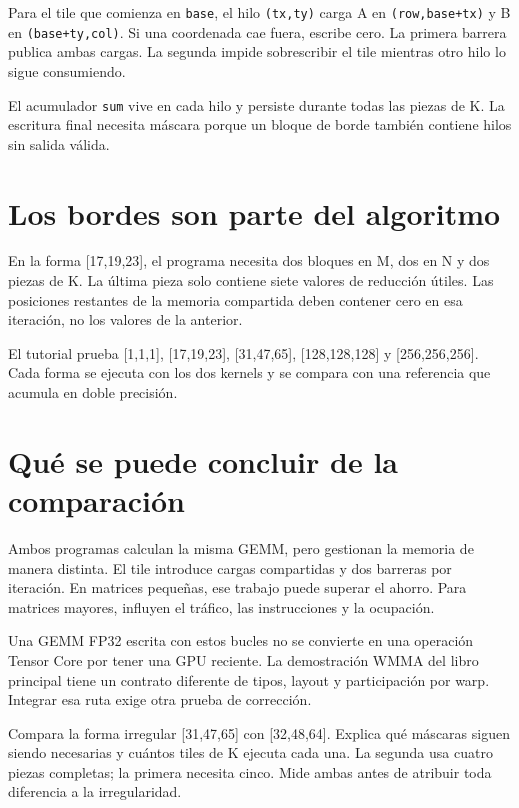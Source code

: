 \documentclass[12pt,a4paper,oneside]{report}
\begin{document}
Para el tile que comienza en \texttt{base}, el hilo \texttt{(tx,ty)} carga A en \texttt{(row,base+tx)} y B en \texttt{(base+ty,col)}. Si una coordenada cae fuera, escribe cero. La primera barrera publica ambas cargas. La segunda impide sobrescribir el tile mientras otro hilo lo sigue consumiendo.

El acumulador \texttt{sum} vive en cada hilo y persiste durante todas las piezas de K. La escritura final necesita máscara porque un bloque de borde también contiene hilos sin salida válida.

\section{Los bordes son parte del algoritmo}
En la forma [17,19,23], el programa necesita dos bloques en M, dos en N y dos piezas de K. La última pieza solo contiene siete valores de reducción útiles. Las posiciones restantes de la memoria compartida deben contener cero en esa iteración, no los valores de la anterior.

El tutorial prueba [1,1,1], [17,19,23], [31,47,65], [128,128,128] y [256,256,256]. Cada forma se ejecuta con los dos kernels y se compara con una referencia que acumula en doble precisión.

\section{Qué se puede concluir de la comparación}
Ambos programas calculan la misma GEMM, pero gestionan la memoria de manera distinta. El tile introduce cargas compartidas y dos barreras por iteración. En matrices pequeñas, ese trabajo puede superar el ahorro. Para matrices mayores, influyen el tráfico, las instrucciones y la ocupación.

Una GEMM FP32 escrita con estos bucles no se convierte en una operación Tensor Core por tener una GPU reciente. La demostración WMMA del libro principal tiene un contrato diferente de tipos, layout y participación por warp. Integrar esa ruta exige otra prueba de corrección.

\begin{practica}
Compara la forma irregular [31,47,65] con [32,48,64]. Explica qué máscaras siguen siendo necesarias y cuántos tiles de K ejecuta cada una. La segunda usa cuatro piezas completas; la primera necesita cinco. Mide ambas antes de atribuir toda diferencia a la irregularidad.

\end{practica}
\end{document}
